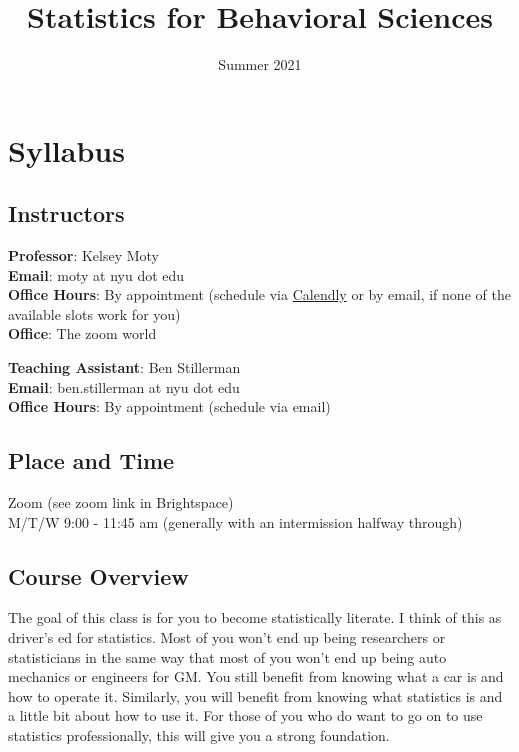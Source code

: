 \documentclass[
]{book}
\title{Statistics for Behavioral Sciences}
\author{}
\date{\vspace{-2.5em}Summer 2021}
\begin{document}
\maketitle

{
\setcounter{tocdepth}{1}
\tableofcontents
}
\hypertarget{syllabus}{%
\chapter{Syllabus}\label{syllabus}}

\hypertarget{instructors}{%
\section{Instructors}\label{instructors}}

\textbf{Professor}: Kelsey Moty\\
\textbf{Email}: moty at nyu dot edu\\
\textbf{Office Hours}: By appointment (schedule via \href{https://calendly.com/kelseymoty/stats-office-hours}{Calendly} or by email, if none of the available slots work for you)\\
\textbf{Office}: The zoom world

\textbf{Teaching Assistant}: Ben Stillerman\\
\textbf{Email}: ben.stillerman at nyu dot edu\\
\textbf{Office Hours}: By appointment (schedule via email)

\hypertarget{place-and-time}{%
\section{Place and Time}\label{place-and-time}}

Zoom (see zoom link in Brightspace)\\
M/T/W 9:00 - 11:45 am (generally with an intermission halfway through)

\hypertarget{course-overview}{%
\section{Course Overview}\label{course-overview}}

The goal of this class is for you to become statistically literate. I think of this as driver's ed for statistics. Most of you won't end up being researchers or statisticians in the same way that most of you won't end up being auto mechanics or engineers for GM. You still benefit from knowing what a car is and how to operate it. Similarly, you will benefit from knowing what statistics is and a little bit about how to use it. For those of you who do want to go on to use statistics professionally, this will give you a strong foundation.
\end{document}
